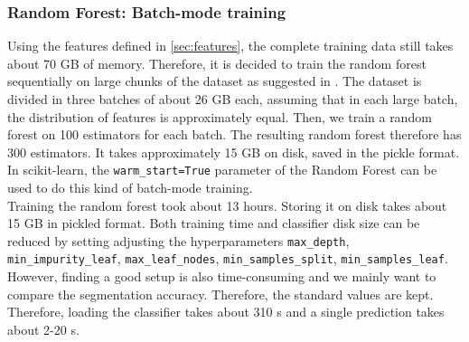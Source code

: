 \documentclass[final]{article}
\begin{document}
\subsubsection{Random Forest: Batch-mode training}
Using the features defined in \cref{sec:features}, the complete training data
still takes about 70 GB of memory. Therefore, it is decided to train the
random forest sequentially on large chunks of the dataset as suggested in
\cite{batchrf}. The dataset is divided in three batches of about 26 GB
each, assuming that in each large batch, the distribution of features is
approximately equal. Then, we train a random forest on 100 estimators for each
batch. The resulting random forest therefore has 300 estimators. It takes
approximately 15 GB on disk, saved in the pickle format. In scikit-learn,
the \verb+warm_start=True+ parameter of the Random Forest can be used to do
this kind of batch-mode training. \\

Training the random forest took about 13 hours. Storing it on disk takes
about 15 GB in pickled format. Both training time and classifier disk
size can be reduced by setting adjusting the hyperparameters \verb+max_depth+,
\verb+min_impurity_leaf+, \verb+max_leaf_nodes+, \verb+min_samples_split+,
\verb+min_samples_leaf+. However, finding a good setup is also time-consuming
and we mainly want to compare the segmentation accuracy. Therefore, the
standard values are kept. Therefore, loading the classifier takes about
310 s and a single prediction takes about 2-20 s. 
\end{document}
